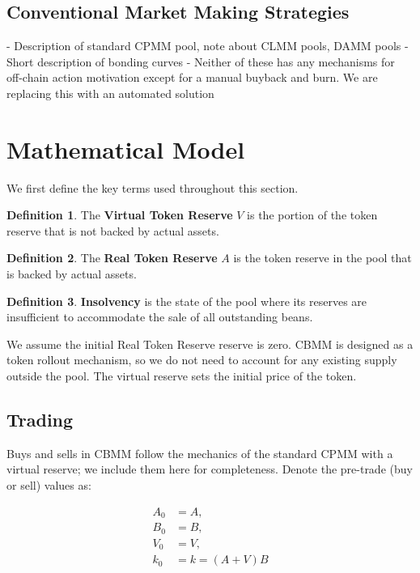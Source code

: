 \documentclass[11pt,a4paper]{article}
\theoremstyle{definition}
\newtheorem{definition}{Definition}[section]
\begin{document}
\subsection{Conventional Market Making Strategies}

- Description of standard CPMM pool, note about CLMM pools, DAMM pools
- Short description of bonding curves
- Neither of these has any mechanisms for off-chain action motivation except for a manual buyback and burn. We are replacing this with an automated solution

\section{Mathematical Model}
\label{sec:math}

We first define the key terms used throughout this section.

\begin{definition}
    The \textbf{Virtual Token Reserve} $V$ is the portion of the token reserve that is not backed by actual assets. 
\end{definition}

\begin{definition}
    The \textbf{Real Token Reserve} $A$ is the token reserve in the pool that is backed by actual assets.
\end{definition}

\begin{definition}
    \textbf{Insolvency} is the state of the pool where its reserves are insufficient to accommodate the sale of all outstanding beans.
\end{definition}

We assume the initial Real Token Reserve reserve is zero. CBMM is designed as a token rollout mechanism, so we do not need to account for any existing supply outside the pool. The virtual reserve sets the initial price of the token.

\subsection{Trading}

Buys and sells in CBMM follow the mechanics of the standard CPMM with a virtual reserve; we include them here for completeness. Denote the pre-trade (buy or sell) values as:

\begin{align*}
    A_0 &= A, \\
    B_0 &= B, \\
    V_0 &= V, \\
    k_0 &= k = (A+V)B
\end{align*}
\end{document}

